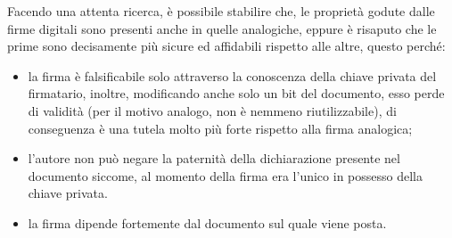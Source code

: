 Facendo una attenta ricerca, è possibile stabilire che, le proprietà godute dalle firme digitali sono presenti anche in quelle analogiche, eppure è risaputo che le prime sono decisamente più sicure ed affidabili rispetto alle altre, questo perché:
\begin{itemize}
	\item la firma è falsificabile solo attraverso la conoscenza della chiave privata del firmatario, inoltre, modificando anche solo un bit del documento, esso perde di validità (per il motivo analogo, non è nemmeno riutilizzabile), di conseguenza è una tutela molto più forte rispetto alla firma analogica;
	\item l'autore non può negare la paternità della dichiarazione presente nel documento siccome, al momento della firma era l'unico in possesso della chiave privata.
	\item la firma dipende fortemente dal documento sul quale viene posta.
\end{itemize}
